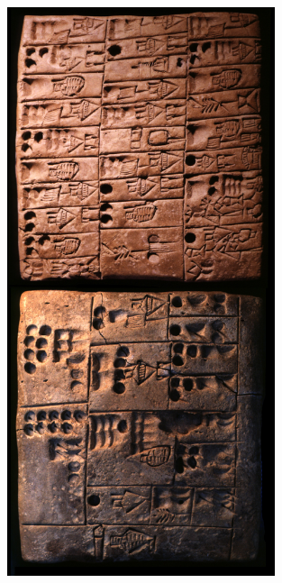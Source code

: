 \documentclass{beamer}
\begin{document}
\begin{frame}
\begin{columns}
\begin{column}{0.4\textwidth}
\begin{figure}[htbp]
            \includegraphics[width=0.7\textwidth]{images/P005322.jpg}
         \end{figure}
      \end{column}
   \end{columns}
\end{frame}
\end{document}
